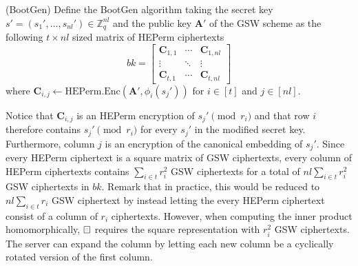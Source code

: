 \begin{definition}(BootGen)
    Define the BootGen algorithm taking the secret key $s' = (s_1', \dots, s_{nl}') \in \mathbb{Z}_q^{nl}$ and the public key $\mathbf{A}'$ of the GSW scheme as the following $t \times nl$ sized matrix of HEPerm ciphertexts
    \begin{equation}\label{bk}
        bk =
        \left[
        \begin{array}{ccc}
            \mathbf{C}_{1,1} & \cdots & \mathbf{C}_{1,nl} \\
            \vdots & \ddots  & \vdots\\
            \mathbf{C}_{t,1}  & \cdots & \mathbf{C}_{t,nl} 
        \end{array}
        \right]
    \end{equation}
    where $\mathbf{C}_{i,j} \leftarrow \text{HEPerm.Enc}(\mathbf{A}', \phi_i(s_j'))$ for $i \in [t]$ and $j \in [nl]$.
\end{definition}
Notice that $\mathbf{C}_{i,j}$ is an HEPerm encryption of $s_j' \pmod {r_i}$ and that row $i$ therefore contains $s_j' \pmod {r_i}$ for every $s_j'$ in the modified secret key. Furthermore, column $j$ is an encryption of the canonical embedding of $s_j'$. Since every HEPerm ciphertext is a square matrix of GSW ciphertexts, every column of HEPerm ciphertexts contains $\sum\limits_{i \in t} r_i^2$ GSW ciphertexts for a total of $nl \sum\limits_{i \in t} r_i^2$ GSW ciphertexts in $bk$. Remark that in practice, this would be reduced to $nl \sum\limits_{i \in t} r_i$ GSW ciphertext by instead letting the every HEPerm ciphertext consist of a column of $r_i$ ciphertexts. However, when computing the inner product homomorphically, $\boxring$ requires the square representation with $r_i^2$ GSW ciphertexts. The server can expand the column by letting each new column be a cyclically rotated version of the first column. 
